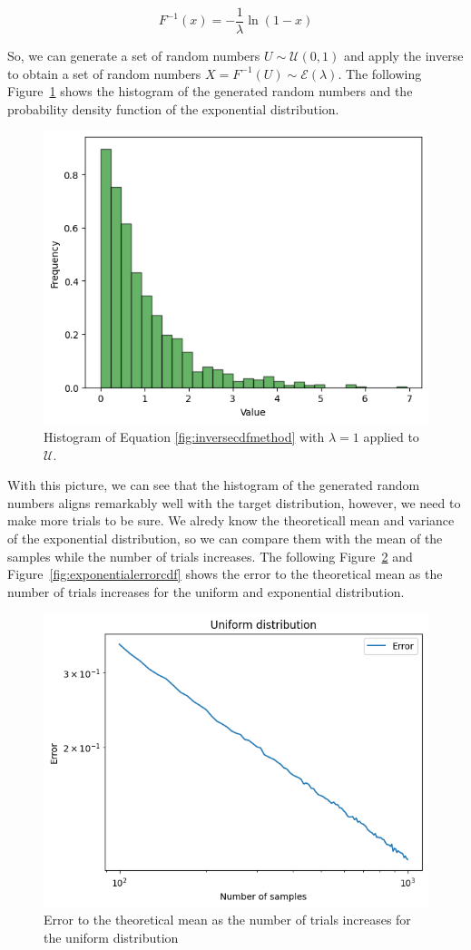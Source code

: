 \documentclass{article}
\begin{document}
\begin{equation}\label{eq:inversecdf} F^{-1}(x) = -\frac{1}{\lambda} \ln(1-x) \end{equation}

So, we can generate a set of random numbers \(U \sim \mathcal{U}(0,1)\) and apply the inverse to obtain a set of random numbers \(X = F^{-1}(U) \sim \mathcal{E}(\lambda)\). The following Figure~\ref{fig:inversecdfmethod} shows the histogram of the generated random numbers and the probability density function of the exponential distribution.

\begin{figure}[H]
	\centering
	\includegraphics[width=0.5\linewidth]{./Figures/InverseCDF/histogram.png}
	\caption{Histogram of Equation \eqref{fig:inversecdfmethod} with \(\lambda = 1\) applied to \(\mathcal{U}\).}
	\label{fig:inversecdfmethod}
\end{figure}

With this picture, we can see that the histogram of the generated random numbers aligns remarkably well with the target distribution, however, we need to make more trials to be sure. We alredy know the theoreticall mean and variance of the exponential distribution, so we can compare them with the mean of the samples while the number of trials increases. The following Figure~\ref{fig:uniformerrorcdf} and Figure~\ref{fig:exponentialerrorcdf} shows the error to the theoretical mean as the number of trials increases for the uniform and exponential distribution.

\begin{figure}[H]
	\centering
	\includegraphics[width=0.5\linewidth]{./Figures/InverseCDF/uniform_error.png}
	\caption{Error to the theoretical mean as the number of trials increases for the uniform distribution}
	\label{fig:uniformerrorcdf}
\end{figure}
\end{document}
